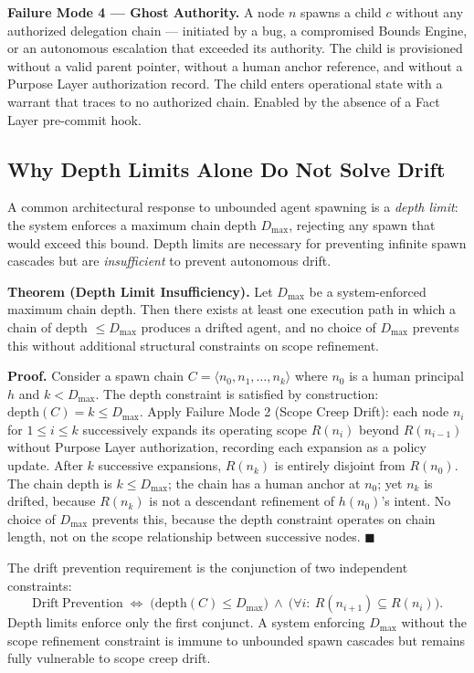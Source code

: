 \medskip
\noindent\textbf{Failure Mode 4 — Ghost Authority.}
A node $n$ spawns a child $c$ without any authorized delegation chain — initiated by a bug, a compromised Bounds Engine, or an autonomous escalation that exceeded its authority. The child is provisioned without a valid parent pointer, without a human anchor reference, and without a Purpose Layer authorization record. The child enters operational state with a warrant that traces to no authorized chain. Enabled by the absence of a Fact Layer pre-commit hook.

\subsection{Why Depth Limits Alone Do Not Solve Drift}
\label{sec:drift-depth-limits}

A common architectural response to unbounded agent spawning is a \emph{depth limit}: the system enforces a maximum chain depth $D_{\max}$, rejecting any spawn that would exceed this bound. Depth limits are necessary for preventing infinite spawn cascades but are \emph{insufficient} to prevent autonomous drift.

\medskip
\noindent\textbf{Theorem (Depth Limit Insufficiency).}
Let $D_{\max}$ be a system-enforced maximum chain depth. Then there exists at least one execution path in which a chain of depth $\leq D_{\max}$ produces a drifted agent, and no choice of $D_{\max}$ prevents this without additional structural constraints on scope refinement.

\medskip
\noindent\textbf{Proof.} Consider a spawn chain $C = \langle n_0, n_1, \ldots, n_k \rangle$ where $n_0$ is a human principal $h$ and $k < D_{\max}$. The depth constraint is satisfied by construction: $\mathrm{depth}(C) = k \leq D_{\max}$. Apply Failure Mode 2 (Scope Creep Drift): each node $n_i$ for $1 \leq i \leq k$ successively expands its operating scope $R(n_i)$ beyond $R(n_{i-1})$ without Purpose Layer authorization, recording each expansion as a policy update. After $k$ successive expansions, $R(n_k)$ is entirely disjoint from $R(n_0)$. The chain depth is $k \leq D_{\max}$; the chain has a human anchor at $n_0$; yet $n_k$ is drifted, because $R(n_k)$ is not a descendant refinement of $h(n_0)$'s intent. No choice of $D_{\max}$ prevents this, because the depth constraint operates on chain length, not on the scope relationship between successive nodes. $\blacksquare$

The drift prevention requirement is the conjunction of two independent constraints:
\begin{equation}
\mathrm{Drift\ Prevention} \;\iff\; \bigl( \mathrm{depth}(C) \leq D_{\max} \bigr)\ \land\ \bigl( \forall i:\ R(n_{i+1}) \subseteq R(n_i) \bigr).
\label{eq:drift-prevention-constraint}
\end{equation}
Depth limits enforce only the first conjunct. A system enforcing $D_{\max}$ without the scope refinement constraint is immune to unbounded spawn cascades but remains fully vulnerable to scope creep drift.

